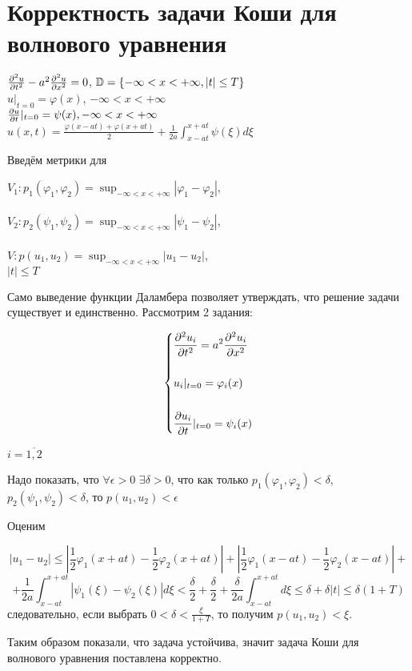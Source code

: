 \documentclass[../main.tex]{subfiles}
\begin{document}
\section{Корректность задачи Коши для волнового уравнения}
\begin{large}
    \begin{center}
        $\frac{\partial^2 u}{\partial t^2}-a^2\frac{\partial^2 u}{\partial x^2}=0$, $\mathbb{D}=\{ -\infty<x<+\infty, |t|\leq T\rbrace$\\
        $ $\\
        $ u|_{t=0} = \varphi(x)$, $-\infty<x<+\infty$\\ 
        $ $\\
        $\frac{\partial u}{\partial t}|_{t=0} = \psi(x),  -\infty<x<+\infty$\\
        $ $\\
        $u(x,t)=\frac{\varphi(x-at)+\varphi(x+at)}{2}+\frac{1}{2a}\int_{x-at}^{x+at}\psi(\xi)d\xi$
    \end{center}
\end{large}
Введём метрики для
\begin{center}
$V_1:p_1(\varphi_1,\varphi_2)=\sup_{-\infty<x<+\infty}|\varphi_1-\varphi_2|$,\\
~\\
$V_2:p_2(\psi_1,\psi_2)=\sup_{-\infty<x<+\infty}|\psi_1-\psi_2|$,\\
~\\
$V:p(u_1,u_2)=\sup_{-\infty<x<+\infty}|u_1-u_2|$,\\ $|t| \leq T$\\
\end{center}

Само выведение функции Даламбера позволяет утверждать, что решение задачи существует и единственно. Рассмотрим 2 задания:

$$\begin{dcases}
\frac{\partial^2 u_i}{\partial t^2}=a^2\frac{\partial^2 u_i}{\partial x^2}\\\\
     u_i|_{t=0}=\varphi_i(x)\\\\
     \frac{\partial u_i}{\partial t}|_{t=0}=\psi_i(x)
\end{dcases} $$ 

$i=\overline{1,2}$

Надо показать, что $\forall \epsilon > 0$  $\exists \delta > 0$,  что как только $p_1(\varphi_1, \varphi_2)<\delta$, $p_2(\psi_1, \psi_2)<\delta$, то $p(u_1, u_2)<\epsilon$

Оценим

\[|u_1-u_2| \leq |\frac{1}{2}\varphi_1(x+at)-\frac{1}{2}\varphi_2(x+at)|+|\frac{1}{2}\varphi_1(x-at)-\frac{1}{2}\varphi_2(x-at)|+\]
\[+\frac{1}{2a}\int_{x-at}^{x+at}|\psi_1(\xi)-\psi_2(\xi)|d\xi<\frac{\delta}{2}+\frac{\delta}{2}+\frac{\delta}{2a}\int_{x-at}^{x+at}d\xi \leq \delta+\delta|t| \leq \delta(1+T)\] следовательно, если выбрать $0<\delta<\frac{\xi}{1+T}$, то получим $p(u_1, u_2)<\xi$.

Таким образом показали, что задача устойчива, значит задача Коши для волнового уравнения поставлена корректно.
\end{document}

